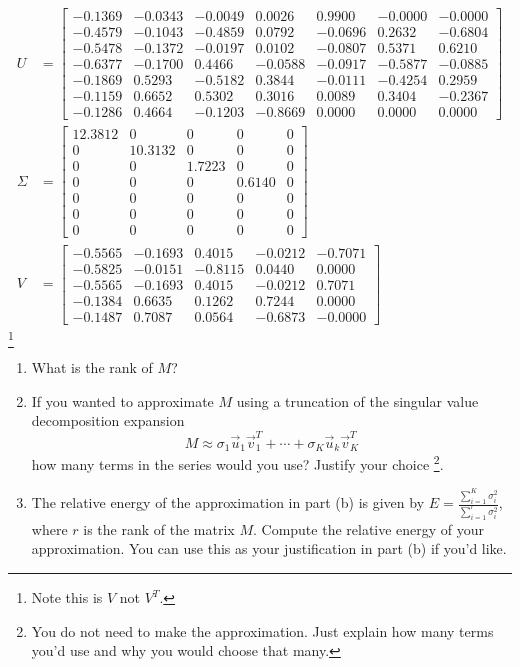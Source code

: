 \documentclass[letter,11pt]{article}
\theoremstyle{definition}
\begin{document}
\begin{align*}
U&=\begin{bmatrix}
-0.1369 & -0.0343 & -0.0049 & 0.0026 & 0.9900 & -0.0000 & -0.0000 \\
-0.4579 & -0.1043 & -0.4859 & 0.0792 & -0.0696 & 0.2632 & -0.6804 \\
-0.5478 & -0.1372 & -0.0197 & 0.0102 & -0.0807 & 0.5371 & 0.6210 \\
-0.6377 & -0.1700 & 0.4466 & -0.0588 & -0.0917 & -0.5877 & -0.0885 \\
-0.1869 & 0.5293 & -0.5182 & 0.3844 & -0.0111 & -0.4254 & 0.2959 \\
-0.1159 & 0.6652 & 0.5302 & 0.3016 & 0.0089 & 0.3404 & -0.2367 \\
-0.1286 & 0.4664 & -0.1203 & -0.8669 & 0.0000 & 0.0000 & 0.0000
\end{bmatrix}\\
\Sigma&=\begin{bmatrix}
12.3812 & 0 & 0 & 0 & 0 \\
0 & 10.3132 & 0 & 0 & 0 \\
0 & 0 & 1.7223 & 0 & 0 \\
0 & 0 & 0 & 0.6140 & 0 \\
0 & 0 & 0 & 0 & 0 \\
0 & 0 & 0 & 0 & 0 \\
0 & 0 & 0 & 0 & 0
\end{bmatrix} \\
V&=\begin{bmatrix}
-0.5565 & -0.1693 & 0.4015 & -0.0212 & -0.7071 \\
-0.5825 & -0.0151 & -0.8115 & 0.0440 & 0.0000 \\
-0.5565 & -0.1693 & 0.4015 & -0.0212 & 0.7071 \\
-0.1384 & 0.6635 & 0.1262 & 0.7244 & 0.0000 \\
-0.1487 & 0.7087 & 0.0564 & -0.6873 & -0.0000
\end{bmatrix}
\end{align*}\footnote{Note this is $V$ not $V^{T}$.}

\begin{enumerate}[label = \alph*.)]
    \item  What is the rank of $M$?
    
    \item  If you wanted to approximate $M$ using a truncation of the singular value decomposition expansion
     $$M \approx \sigma_{1} \vec{u}_{1} \vec{v}_{1}^{T}+\cdots+\sigma_{K} \vec{u}_{k} \vec{v}_{K}^{T}$$ how many terms in the series would you use? Justify your choice \footnote{You do not need to make the approximation. Just explain how many terms you'd use and why you would choose that many.}.
     
     \item The relative energy of the approximation in part (b) is given by $E=\frac{\sum_{i=1}^{K} \sigma_{i}^{2}}{\sum_{i=1}^{r} \sigma_{i}^{2}}$, where $r$ is the rank of the matrix $M$. Compute the relative energy of your approximation. You can use this as your justification in part (b) if you'd like.
\end{enumerate}
\end{document}
